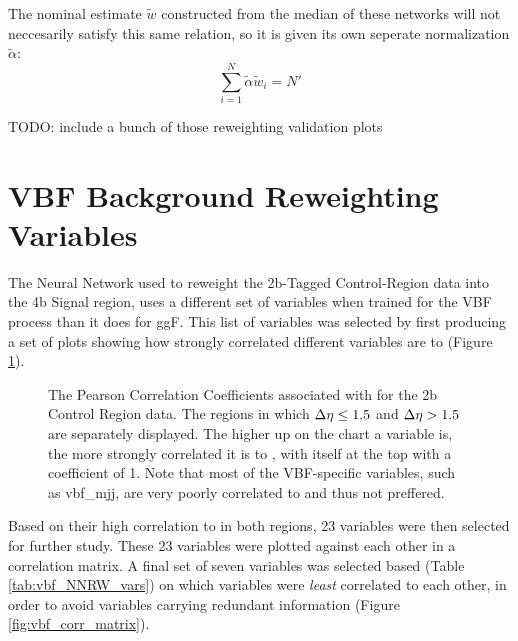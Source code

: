 The nominal estimate $\tilde{w}$ constructed from the median of these networks will not neccesarily satisfy this same relation,
    so it is given its own seperate normalization $\tilde \alpha$:
    \begin{equation}
    \sum_{i=1}^{N} \tilde \alpha \tilde w_i = N'
    \end{equation}

    TODO: include a bunch of those reweighting validation plots


\section{VBF Background Reweighting Variables} \label{app:vbf_bgdNNRW}
    The Neural Network used to reweight the 2b-Tagged Control-Region data into the 4b Signal region,
        uses a different set of variables when trained for the VBF process than it does for ggF.
    This list of variables was selected by first producing a set of plots showing how strongly correlated different variables are to \mhh
        (Figure \ref{fig:mhh_corr}).

    \begin{figure}[!htbp]
        \caption{
            The Pearson Correlation Coefficients associated with \mhh for the 2b Control Region data.
            The regions in which $\Delta \eta \leq 1.5$ and $\Delta \eta>1.5$ are separately displayed.
            The higher up on the chart a variable is, the more strongly correlated it is to \mhh,
                with \mhh itself at the top with a coefficient of 1.
            Note that most of the VBF-specific variables, such as vbf\_mjj, are very poorly correlated to \mhh and thus not preffered.
        }
        \label{fig:mhh_corr}
    \end{figure}

    Based on their high correlation to \mhh in both \deta regions, 23 variables were then selected for further study.
    These 23 variables were plotted against each other in a correlation matrix.
    A final set of seven variables was selected based (Table \ref{tab:vbf_NNRW_vars}) on which variables were \textit{least} correlated to each other,
        in order to avoid variables carrying redundant information (Figure \ref{fig:vbf_corr_matrix}).

